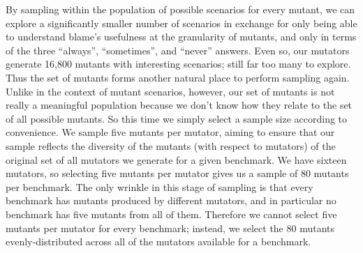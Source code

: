By sampling within the population of possible scenarios for every mutant, we can explore a significantly smaller number of scenarios in exchange for only being able to understand blame's usefulness at the granularity of mutants, and only in terms of the three ``always'', ``sometimes'', and ``never'' answers.
Even so, our mutators generate 16,800 mutants with interesting scenarios; still far too many to explore.
Thus the set of mutants forms another natural place to perform sampling again.
Unlike in the context of mutant scenarios, however, our set of mutants is not really a meaningful population because we don't know how they relate to the set of all possible mutants.
So this time we simply select a sample size according to convenience.
We sample five mutants per mutator, aiming to ensure that our sample reflects the diversity of the mutants (with respect to mutators) of the original set of all mutators we generate for a given benchmark.
We have sixteen mutators, so selecting five mutants per mutator gives us a sample of 80 mutants per benchmark.
The only wrinkle in this stage of sampling is that every benchmark has mutants produced by different mutators, and in particular no benchmark has five mutants from all of them.
Therefore we cannot select five mutants per mutator for every benchmark; instead, we select the 80 mutants evenly-distributed across all of the mutators available for a benchmark.


